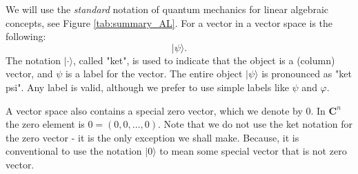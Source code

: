 We will use the \textit{standard} notation of quantum mechanics for linear algebraic concepts, see Figure \ref{tab:summary_AL}. For a vector in a vector space is the following:
\begin{equation}
    |\psi\rangle .
\end{equation}
The notation $|\cdot\rangle$, called "ket", is used to indicate that the object is a (column) vector, and $\psi$ is a label for the vector. The entire object $|\psi\rangle$ is pronounced  as "ket psi". Any label is valid, although we prefer to use simple labels like $\psi$ and $\varphi$.

\begin{remark} %
    A vector space also contains a special zero vector, which we denote by 0. In $\mathbf{C}^{n}$ the zero element is $0=(0,0, \ldots, 0)$. Note that we do not use the ket notation for the zero vector - it is the only exception we shall make. Because, it is conventional to use the notation $|0\rangle$ to mean some special vector that is not zero vector.
\end{remark}

